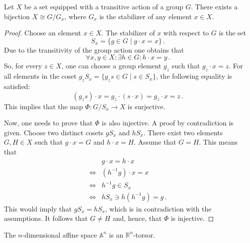     \begin{property}\label{group:transitive_action_property}
        Let $X$ be a set equipped with a transitive action of a group $G$. There exists a bijection $X\cong G/G_x$, where $G_x$ is the stabilizer of any element $x\in X$.

        \begin{mdframed}[roundcorner=10pt, linecolor=blue, linewidth=1pt]
            \begin{proof}
                Choose an element $x\in X$. The stabilizer of $x$ with respect to $G$ is the set \[S_x = \{g\in G\mid g\cdot x = x\}\,.\] Due to the transitivity of the group action one obtains that \[\forall x, y\in X: \exists h\in G: h\cdot x = y\,.\] So, for every $z\in X$, one can choose a group element $g_z$ such that $g_z\cdot x = z$. For all elements in the coset $g_zS_x = \{g_zs\in G\mid s\in S_x\}$, the following equality is satisfied: \[(g_zs)\cdot x = g_z\cdot (s\cdot x) = g_z\cdot x = z\,.\] This implies that the map $\Phi:G/S_x \rightarrow X$ is surjective.

                Now, one needs to prove that $\Phi$ is also injective. A proof by contradiction is given. Choose two distinct cosets $gS_x$ and $hS_x$. There exist two elements $G,H\in X$ such that $g\cdot x = G$ and $h\cdot x = H$. Assume that $G = H$. This means that
                \begin{align*}
                    &g\cdot x = h\cdot x\\
                    \iff&(h^{-1}g)\cdot x = x\\
                    \iff&h^{-1}g\in S_x\\
                    \iff&hS_x\ni h(h^{-1}g) = g\,.
                \end{align*}
                This would imply that $gS_x = hS_x$, which is in contradiction with the assumptions. It follows that $G\neq H$ and, hence, that $\Phi$ is injective.
            \end{proof}
        \end{mdframed}
    \end{property}

    \begin{example}
        The $n$-dimensional affine space $\mathbb{A}^n$ is an $\mathbb{R}^n$-torsor.
    \end{example}

